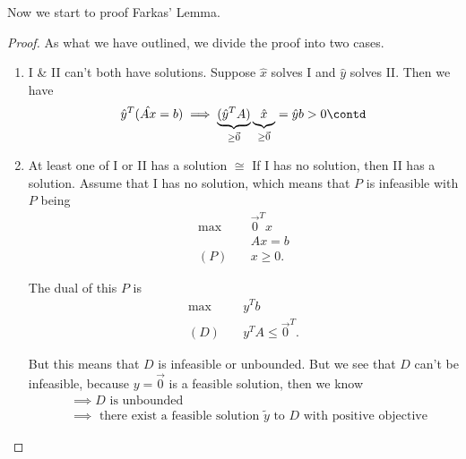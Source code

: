 Now we start to proof Farkas' Lemma.
\begin{proof}
	As what we have outlined, we divide the proof into two cases.
	\begin{enumerate}
		\item I \& II can't both have solutions. Suppose \(\hat{x}\) solves I and \(\hat{y}\) solves II. Then we have
		      \[
			      \hat{y}^{T}(\hat{Ax} = b) \implies \underbrace{(\hat{y}^{T} A)}_{\geq  \vec{0}}\underbrace{\vphantom{\hat{y}^{T}}\hat{x}}_{\geq  \vec{0}} = \hat{y} b > 0\contd
		      \]
		\item At least one of I or II has a solution \(\cong\) If I has no solution, then II has a solution. Assume that I has no solution, which
		      means that \(P\) is infeasible with \(P\) being
		      \begin{align*}
			      \max~    & \vec{0}^{T} x \\
			               & Ax = b        \\
			      (P)\quad & x\geq 0.
		      \end{align*}

		      The dual of this \(P\) is
		      \begin{align*}
			      \max~    & y^{T}b                    \\
			      (D)\quad & y^{T} A \leq \vec{0}^{T}.
		      \end{align*}

		      But this means that \(D\) is infeasible or unbounded.	But we see that \(D\) can't be infeasible, because \(y = \vec{0}\) is a
		      feasible solution, then we know
		      \[
			      \begin{split}
				      &\implies D \text{ is unbounded} \\
				      &\implies \text{ there exist a feasible solution \(\widetilde{y}\) to \(D\) with positive objective}
			      \end{split}
		      \]
	\end{enumerate}
\end{proof}

